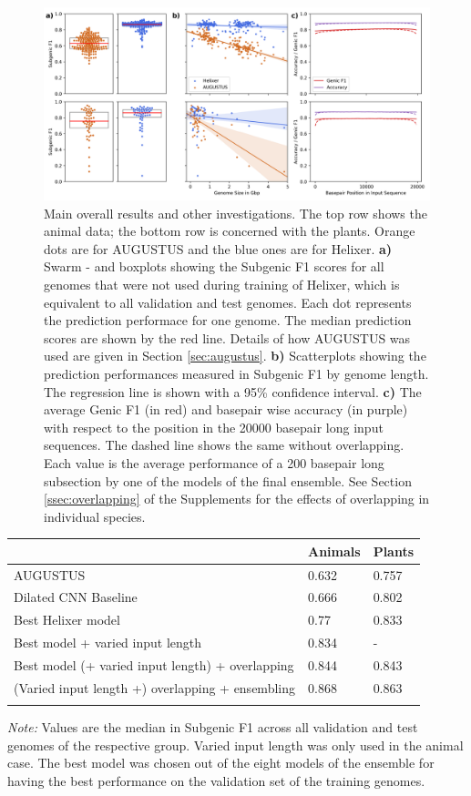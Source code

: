 \documentclass{bioinfo}
\begin{document}
\begin{figure}[!tpb]
\label{fig:main_results}
\centerline{\includegraphics[width=\textwidth]{images/main_results}}
\caption{Main overall results and other investigations. The top row shows the animal
 data; the bottom row is concerned with the plants. Orange dots are for AUGUSTUS and 
the blue ones are for Helixer. {\bf a)} Swarm - and boxplots showing the Subgenic F1 
scores for all genomes that were not used during training of Helixer, which is 
equivalent to all validation and test genomes. Each dot represents the prediction 
performace for one genome. The median prediction scores are shown by the red line. 
Details of how AUGUSTUS was used are given in Section \ref{sec:augustus}. {\bf b)} 
Scatterplots showing the prediction performances measured in Subgenic F1 by genome 
length. The regression line is shown with a 95\% confidence interval. {\bf c)} The 
average Genic F1 (in red) and basepair wise accuracy (in purple) with respect to 
the position in the 20000 basepair long input sequences. The dashed line shows the 
same without overlapping. Each value is the average performance of a 200 basepair 
long subsection by one of the models of the final ensemble. 
See Section \ref{ssec:overlapping} of the 
Supplements for the effects of overlapping in individual species.}
\end{figure}

\begin{table}[!t]
 {
\begin{tabular}{@{}lll@{}}
\toprule & Animals & Plants\\
\midrule
AUGUSTUS & 0.632 & 0.757 \\
Dilated CNN Baseline & 0.666 &  0.802 \\
Best Helixer model & 0.77  & 0.833  \\
Best model + varied input length & 0.834  & - \\
Best model (+ varied input length) + overlapping &  0.844  & 0.843  \\
(Varied input length +) overlapping + ensembling & 0.868  & 0.863  \\
\botrule
\end{tabular}}{{\it Note:} Values are the median in Subgenic F1 across all 
validation and test genomes of the respective group. Varied input length was only 
used in the animal case. The best model was chosen out of the eight models of the 
ensemble for having the best performance on the validation set of the training genomes.}
\end{table}
\end{document}
